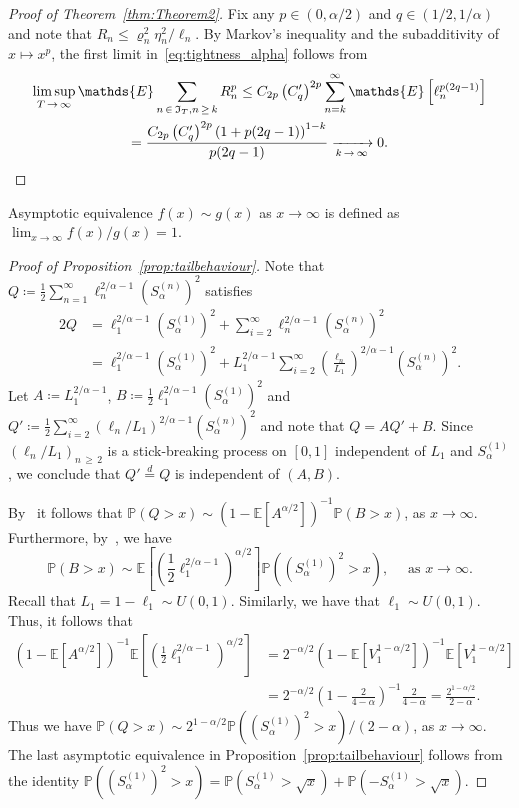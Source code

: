 \documentclass[10pt]{amsart}
\theoremstyle{definition}\newtheorem{defi}[theo]{Definition}\newtheorem{rema}[theo]{Remark}\newtheorem{exam}[theo]{Example}\newtheorem{exem}[theo]{Example}\newtheorem{nota}[theo]{Notation}
\newcommand\E{\mathds{E}}
\newcommand\p{\mathds{P}}
\newcommand\1{\mathds{1}}
\newcommand\GI{\mathfrak{I}}
\newcommand\eqd{\overset{d}{=}}
\begin{document}
\begin{proof}[Proof of Theorem~\ref{thm:Theorem2}]
Fix any $p\in(0,\alpha/2)$ and $q\in(1/2,1/\alpha)$ and note that $R_n\le\varrho_n^2\eta_n^2/\ell_n$. By Markov's inequality and the subadditivity of $x\mapsto x^p$, the first limit in~\eqref{eq:tightness_alpha} follows from
\begin{multline*}
\limsup_{T\,\to\,\infty}\E\sum_{n\,\in\,\GI_T,n\,\ge\,k}R_n^p \le C_{2p}\left(C'_{q}\right)^{2p}\sum_{n=k}^\infty\E\left[\ell_n^{p(2q-1)}\right]\\
=\frac{C_{2p}\left(C'_{q}\right)^{2p}\left(1+p(2q-1)\right)^{1-k}}{p(2q-1)}
\xrightarrow[k\,\to\,\infty]{}0.
\qedhere
\end{multline*}
\end{proof}

Asymptotic equivalence $f(x)\sim g(x)$ as $x\to\infty$ is defined as $\lim_{x\to\infty}f(x)/g(x)=1$.

\begin{proof}[Proof of Proposition~\ref{prop:tailbehaviour}]
Note that $Q\coloneqq \frac{1}{2}\sum_{n=1}^\infty \ell_n^{2/\alpha-1}(S_\alpha^{(n)})^2$ satisfies
\begin{align*}
2Q &=\ell_1^{2/\alpha-1}\left(S_\alpha^{(1)}\right)^2+\sum_{i=2}^\infty \ell_n^{2/\alpha-1}\left(S_\alpha^{(n)}\right)^2 \\
&= \ell_1^{2/\alpha-1}\left(S_\alpha^{(1)}\right)^2+L_1^{2/\alpha-1}\sum_{i=2}^\infty \left(\frac{\ell_n}{L_1}\right)^{2/\alpha-1}\left(S_\alpha^{(n)}\right)^2.
\end{align*}
Let $A\coloneqq L_1^{2/\alpha-1}$, $B\coloneqq\frac{1}{2}\ell_1^{2/\alpha-1}(S_\alpha^{(1)})^2$ and $Q'\coloneqq\frac{1}{2}\sum_{i=2}^\infty (\ell_n/L_1)^{2/\alpha-1}(S_\alpha^{(n)})^2$ and note that $Q=AQ'+B$. Since $(\ell_n/L_1)_{n\,\ge\,2}$ is a stick-breaking process on $[0,1]$ independent of $L_1$ and $S_\alpha^{(1)}$, we conclude that $Q'\eqd Q$ is independent of $(A,B)$.

By~\cite[Theorem~2.4.3]{PerpetuityBook} it follows that $\p(Q>x)\sim(1-\E[A^{\alpha/2}])^{-1}\p(B>x)$, as $x\to\infty$. Furthermore, by~\cite[Lemma~B.5.1]{PerpetuityBook}, we have
\[
\p(B>x)\sim
\E\left[\left(\frac{1}{2}\ell_1^{2/\alpha-1}
\right)^{\alpha/2}\right]
\p\left(\left(S_\alpha^{(1)}\right)^2>x\right),
\quad\text{ as } x \to \infty.
\]
Recall that $L_1 =1-\ell_1\sim U(0,1)$. Similarly, we have that $\ell_1\sim U(0,1)$. Thus, it follows that
\begin{align*}
\left(1-\E \left[A^{\alpha/2}\right]\right)^{-1}
\E\left[\left(\frac{1}{2}\ell_1^{2/\alpha-1}
\right)^{\alpha/2}\right] &=2^{-\alpha/2}\left(1-\E\left[V_1^{1-\alpha/2}
\right]\right)^{-1}
\E\left[V_1^{1-\alpha/2}\right]\\
&=2^{-\alpha/2}\left(1-\frac{2}{4-\alpha}\right)^{-1}
\frac{2}{4-\alpha} =\frac{2^{1-\alpha/2}}{2-\alpha}.
\end{align*}
Thus we have $\p(Q>x)\sim 2^{1-\alpha/2} \p ((S_\alpha^{(1)})^2>x)/(2-\alpha)$, as $x\to\infty$. The last asymptotic equivalence in Proposition~\ref{prop:tailbehaviour} follows from the identity $\p((S_\alpha^{(1)})^2>x) =\p (S_\alpha^{(1)}>\sqrt{x})+\p (-S_\alpha^{(1)}>\sqrt{x})$.
\end{proof}
\end{document}
